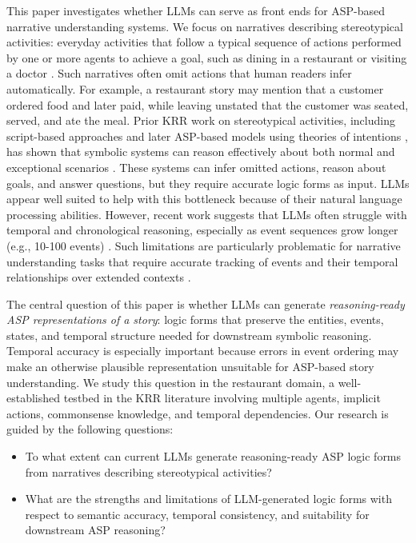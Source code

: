 \documentclass[runningheads]{llncs}
\begin{document}
This paper investigates whether LLMs can serve as front ends for ASP-based narrative understanding systems. We focus on narratives describing stereotypical activities: everyday activities that follow a typical sequence of actions performed by one or more agents to achieve a goal, such as dining in a restaurant or visiting a doctor \cite{sa77}. Such narratives often omit actions that human readers infer automatically. For example, a restaurant story may mention that a customer ordered food and later paid, while leaving unstated that the customer was seated, served, and ate the meal.
Prior KRR work on stereotypical activities, including script-based approaches \cite{sa77,mueller04,m07} and later ASP-based models using theories of intentions \cite{bgb15}, has shown that symbolic systems can reason effectively about both normal and exceptional scenarios \cite{Inclezan2017UnderstandingRS,InclezanZBI18}. These systems can infer omitted actions, reason about goals, and answer questions, but they require accurate logic forms as input. LLMs appear well suited to help with this bottleneck because of their natural language processing abilities. However, recent work suggests that LLMs often struggle with temporal and chronological reasoning, especially as event sequences grow longer (e.g., 10-100 events) \cite{am25,wg25}. 
Such limitations are particularly problematic for narrative understanding tasks that require accurate tracking of events and their temporal relationships over extended contexts \cite{Li2024LongcontextLS}.

The central question of this paper is %
whether LLMs can generate \textit{reasoning-ready ASP representations of a story}: logic forms that preserve the entities, events, states, and temporal structure needed for downstream symbolic reasoning. Temporal accuracy is especially important because errors in event ordering may make an otherwise plausible representation unsuitable for ASP-based story understanding.
We study this question in the restaurant domain, a well-established testbed in the KRR literature involving multiple agents, implicit actions, commonsense knowledge, and temporal dependencies. Our research is guided by the following questions:

\begin{itemize}
\item To what extent can current LLMs generate reasoning-ready ASP logic forms from narratives describing stereotypical activities?

\item What are the strengths and limitations of LLM-generated logic forms with respect to semantic accuracy, temporal consistency, and suitability for downstream ASP reasoning?
\end{itemize}
\end{document}
